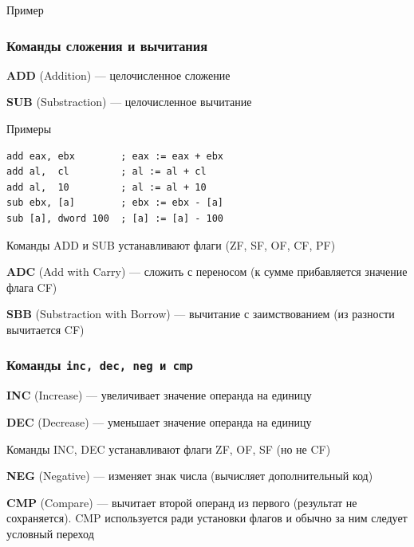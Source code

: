 \documentclass{beamer}
\begin{document}
    \begin{frame}{Пример}
    \end{frame}
    \begin{frame}[fragile]
        \frametitle{Команды сложения и вычитания}
        {\bf ADD} (Addition) --- целочисленное сложение

        {\bf SUB} (Substraction) --- целочисленное вычитание
        \begin{block}{Примеры}
            \begin{verbatim}
add eax, ebx        ; eax := eax + ebx
add al,  cl         ; al := al + cl
add al,  10         ; al := al + 10
sub ebx, [a]        ; ebx := ebx - [a] 
sub [a], dword 100  ; [a] := [a] - 100
            \end{verbatim}
        \end{block}
        Команды ADD и SUB устанавливают флаги (ZF, SF, OF, CF, PF)

        {\bf ADC} (Add with Carry) --- сложить с переносом (к сумме прибавляется значение флага CF)

        {\bf SBB} (Substraction with Borrow) --- вычитание с заимствованием (из разности вычитается CF)
\end{frame}
    \begin{frame}[fragile]
        \frametitle{Команды \tt inc, dec, neg и cmp}
        {\bf INC} (Increase) --- увеличивает значение операнда на единицу

        {\bf DEC} (Decrease) --- уменьшает значение операнда на единицу

        Команды INC, DEC устанавливают флаги ZF, OF, SF (но не CF)

        \bigskip
        {\bf NEG} (Negative) --- изменяет знак числа (вычисляет дополнительный код)

        {\bf CMP} (Compare) --- вычитает второй операнд из первого (результат не сохраняется). CMP используется ради установки флагов и обычно за ним следует условный переход
\end{frame}
\end{document}
